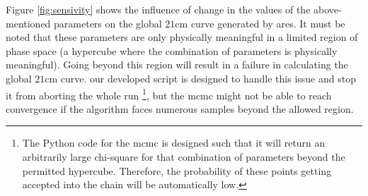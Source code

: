 \documentclass[12pt, TexShade, letterpaper]{report}
\begin{document}
Figure \ref{fig:sensivity} shows the influence of change in the values of the above-mentioned parameters on the global $\mathrm{21cm}$ curve generated by \gls{ares}. It must be noted that these parameters are only physically meaningful in a limited region of phase space (a hypercube where the combination of parameters is physically meaningful). Going beyond this region will result in a failure in calculating the global $\mathrm{21cm}$ curve. our developed script is designed to handle this issue and stop it from aborting the whole run \footnote{The Python code for the \gls{mcmc} is designed such that it will return an arbitrarily large chi-square for that combination of parameters beyond the permitted hypercube. Therefore, the probability of these points getting accepted into the chain will be automatically low.}, but the \gls{mcmc} might not be able to reach convergence if the algorithm faces numerous samples beyond the allowed region.\par

\end{document}
